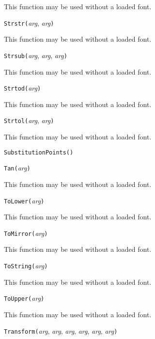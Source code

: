 This function may be used without a loaded font.


\noindent\texttt{Strstr(}\textit{arg}, \textit{arg}\texttt{)}

This function may be used without a loaded font.


\noindent\texttt{Strsub(}\textit{arg}, \textit{arg}, \textit{arg}\texttt{)}

This function may be used without a loaded font.


\noindent\texttt{Strtod(}\textit{arg}\texttt{)}

This function may be used without a loaded font.


\noindent\texttt{Strtol(}\textit{arg}, \textit{arg}\texttt{)}

This function may be used without a loaded font.


\noindent\texttt{SubstitutionPoints(}\texttt{)}


\noindent\texttt{Tan(}\textit{arg}\texttt{)}

This function may be used without a loaded font.


\noindent\texttt{ToLower(}\textit{arg}\texttt{)}

This function may be used without a loaded font.


\noindent\texttt{ToMirror(}\textit{arg}\texttt{)}

This function may be used without a loaded font.


\noindent\texttt{ToString(}\textit{arg}\texttt{)}

This function may be used without a loaded font.


\noindent\texttt{ToUpper(}\textit{arg}\texttt{)}

This function may be used without a loaded font.


\noindent\texttt{Transform(}\textit{arg}, \textit{arg}, \textit{arg}, \textit{arg}, \textit{arg}, \textit{arg}\texttt{)}

